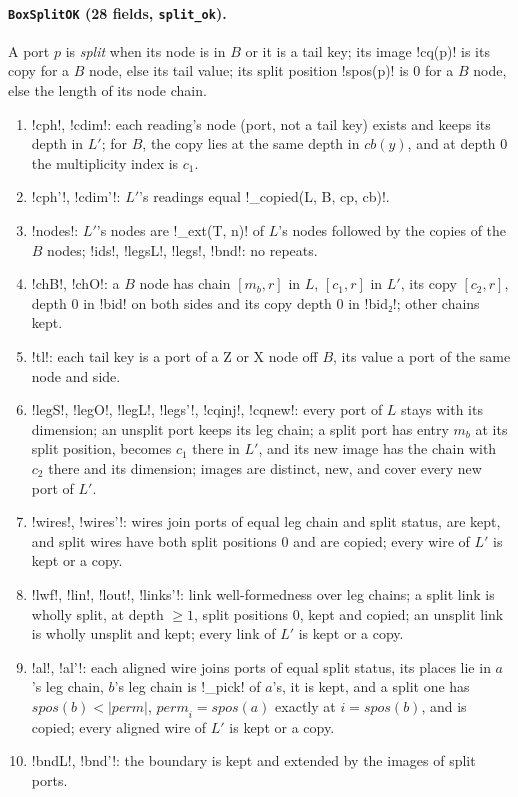 {{{\paragraph{\texttt{BoxSplitOK} (28 fields, \texttt{split\_ok}).}
A port $p$ is \emph{split} when its node is in $B$ or it is a tail key; its image \lexpy!cq(p)! is
its copy for a $B$ node, else its tail value; its split position \lexpy!spos(p)! is 0 for a $B$ node,
else the length of its node chain.
\begin{enumerate}
\item \lexlean!cph!, \lexlean!cdim!: each reading's node (port, not a tail key) exists and keeps its depth
in $L'$; for $B$, the copy lies at the same depth in $\mathit{cb}(y)$, and at depth 0 the
multiplicity index is $c_1$.
\item \lexlean!cph'!, \lexlean!cdim'!: $L'$'s readings equal \lexpy!_copied(L, B, cp, cb)!.
\item \lexlean!nodes!: $L'$'s nodes are \lexpy!_ext(T, n)! of $L$'s nodes followed by the copies of the
$B$ nodes; \lexlean!ids!, \lexlean!legsL!, \lexlean!legs!, \lexlean!bnd!: no repeats.
\item \lexlean!chB!, \lexlean!chO!: a $B$ node has chain $[m_b, r]$ in $L$, $[c_1, r]$ in $L'$, its copy
$[c_2, r]$, depth 0 in \lexcode!bid! on both sides and its copy depth 0 in \lexcode!bid₂!; other chains
kept.
\item \lexlean!tl!: each tail key is a port of a Z or X node off $B$, its value a port of the same
node and side.
\item \lexlean!legS!, \lexlean!legO!, \lexlean!legL!, \lexlean!legs'!, \lexlean!cqinj!, \lexlean!cqnew!: every port
of $L$ stays with its dimension; an unsplit port keeps its leg chain; a split port has entry
$m_b$ at its split position, becomes $c_1$ there in $L'$, and its new image has the chain with
$c_2$ there and its dimension; images are distinct, new, and cover every new port of $L'$.
\item \lexlean!wires!, \lexlean!wires'!: wires join ports of equal leg chain and split status, are kept,
and split wires have both split positions 0 and are copied; every wire of $L'$ is kept or a copy.
\item \lexlean!lwf!, \lexlean!lin!, \lexlean!lout!, \lexlean!links'!: link well-formedness over leg chains; a
split link is wholly split, at depth $\geq 1$, split positions 0, kept and copied; an unsplit link
is wholly unsplit and kept; every link of $L'$ is kept or a copy.
\item \lexlean!al!, \lexlean!al'!: each aligned wire joins ports of equal split status, its places lie
in $a$'s leg chain, $b$'s leg chain is \lexpy!_pick! of $a$'s, it is kept, and a split one has
$\mathit{spos}(b) < |\mathit{perm}|$, $\mathit{perm}_i = \mathit{spos}(a)$ exactly at
$i = \mathit{spos}(b)$, and is copied; every aligned wire of $L'$ is kept or a copy.
\item \lexlean!bndL!, \lexlean!bnd'!: the boundary is kept and extended by the images of split ports.
\end{enumerate}

}}}

